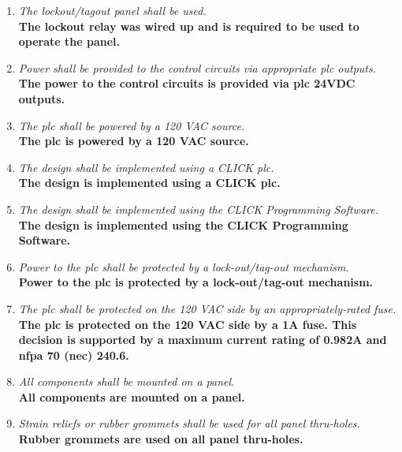 \begin{enumerate}
	\item \emph{ The lockout/tagout panel shall be used.}\\
	      \textbf{The lockout relay was wired up and is required to be used
		      to operate the panel.}

	\item \emph{ Power shall be provided to the control circuits via
		      appropriate \gls{plc} outputs.}\\
	      \textbf{The power to the control circuits is provided via \gls{plc}
		      24VDC outputs.}

	\item \emph{ The \gls{plc} shall be powered by a 120 VAC source.}\\
	      \textbf{The \gls{plc} is powered by a 120 VAC source.}

	\item \emph{ The design shall be implemented using a CLICK \gls{plc}.}\\
	      \textbf{The design is implemented using a CLICK \gls{plc}.}

	\item \emph{ The design shall be implemented using the CLICK
		      Programming Software.}\\
	      \textbf{The design is implemented using the CLICK Programming Software.}

	\item \emph{ Power to the \gls{plc} shall be protected by a
		      lock-out/tag-out mechanism.}\\
	      \textbf{Power to the \gls{plc} is protected by a lock-out/tag-out
		      mechanism.}

	\item \emph{ The \gls{plc} shall be protected on the 120 VAC side by an
		      appropriately-rated fuse.}\\
	      \textbf{
		      The \gls{plc} is protected on the 120 VAC side by a 1A fuse. This
		      decision is supported by
		      a maximum current rating of 0.982A and \gls{nfpa} 70 (\gls{nec}) 240.6.
	      }

	\item \emph{ All components shall be mounted on a panel.}\\
	      \textbf{All components are mounted on a panel.}

	\item \emph{ Strain reliefs or rubber grommets shall be used for
		      all panel thru-holes.}\\
	      \textbf{Rubber grommets are used on all panel thru-holes.}


\end{enumerate}
